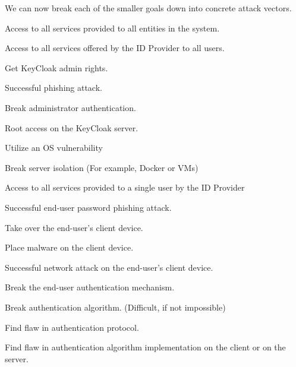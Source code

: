 We can now break each of the smaller goals down into concrete attack vectors.
\begin{nestednums}
\item Access to all services provided to all entities in the system.
  \begin{nestednums}
  \item Access to all services offered by the ID Provider to all users.
    \begin{nestednums}
    \item Get KeyCloak admin rights.
      \begin{nestednums}
      \item Successful phishing attack.
      \item Break administrator authentication.
      \end{nestednums}
    \item Root access on the KeyCloak server.
      \begin{nestednums}
      \item Utilize an OS vulnerability
      \item Break server isolation (For example, Docker or VMs)
      \end{nestednums}
    \end{nestednums}
  \end{nestednums}
\item Access to all services provided to a single user by the ID Provider
  \begin{nestednums}
  \item Successful end-user password phishing attack.
  \item Take over the end-user's client device.
    \begin{nestednums}
    \item Place malware on the client device.
    \item Successful network attack on the end-user's client device.
    \end{nestednums}
  \item Break the end-user authentication mechanism.
    \begin{nestednums}
    \item Break authentication algorithm. (Difficult, if not impossible)
    \item Find flaw in authentication protocol.
    \item Find flaw in authentication algorithm implementation on the client or on the server.
    \end{nestednums}
  \end{nestednums}
\end{nestednums}

